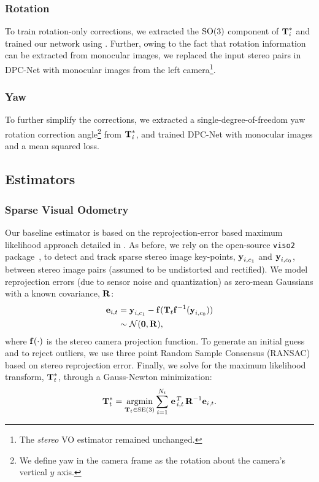 \subsubsection{Rotation}
To train rotation-only corrections, we extracted the $\mathrm{SO}(3)$ component of  $\boldsymbol{\mathbf{T}}^*_i$ and trained our network using . Further, owing to the fact that rotation information can be extracted from monocular images, we replaced the input stereo pairs in DPC-Net with monocular images from the left camera\footnote{The \textit{stereo} VO estimator remained unchanged.}.

\subsubsection{Yaw}
To further simplify the corrections, we extracted a single-degree-of-freedom yaw rotation correction angle\footnote{We define yaw in the camera frame as the rotation about the camera's vertical $y$ axis.} from $\boldsymbol{\mathbf{T}}^*_i$, and trained DPC-Net with monocular images and a mean squared loss.


\subsection{Estimators}
\subsubsection{Sparse Visual Odometry}
Our baseline estimator is based on the reprojection-error based maximum likelihood approach detailed in . As before, we rely on the open-source \texttt{viso2} package~\cite{Geiger2011-xe}, to detect and track sparse stereo image key-points, $\boldsymbol{\mathbf{y}}_{i, c_1}$ and $\boldsymbol{\mathbf{y}}_{i, c_0}$, between stereo image pairs (assumed to be undistorted and rectified). We model reprojection errors (due to sensor noise and quantization) as zero-mean Gaussians with a known covariance, $\boldsymbol{\mathbf{R}}$:
\begin{align}
 \boldsymbol{\mathbf{e}}_{i,t} &= \boldsymbol{\mathbf{y}}_{i, c_1} - \boldsymbol{\mathbf{f}}( \boldsymbol{\mathbf{T}}_t 
    \boldsymbol{\mathbf{f}}^{-1}( \boldsymbol{\mathbf{y}}_{i, c_0} ) ) \\ &\sim \mathcal{N}{}(\boldsymbol{\mathbf{0}},\boldsymbol{\mathbf{R}}),
   \label{eq:dpc_image_error}
\end{align}
where $\boldsymbol{\mathbf{f}}(\cdot)$ is the stereo camera projection function. To generate an initial guess and to reject outliers, we use three point Random Sample Consensus (RANSAC) based on stereo reprojection error.
Finally, we solve for the maximum likelihood transform, $\boldsymbol{\mathbf{T}}_t^*$, through a Gauss-Newton minimization:
\begin{equation}
  \boldsymbol{\mathbf{T}}_t^* = \operatorname*{argmin}_{\boldsymbol{\mathbf{T}}_t\in\text{SE}(3)}\sum_{i=1}^{N_{t}} 
  \left.{\boldsymbol{\mathbf{e}}}\right.^T_{i,t} \boldsymbol{\mathbf{R}}^{-1} \boldsymbol{\mathbf{e}}_{i,t}.
\end{equation}

